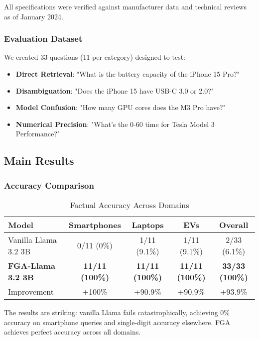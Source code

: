 \documentclass[11pt, a4paper]{article}
\theoremstyle{definition}
\begin{document}
All specifications were verified against manufacturer data and technical reviews as of January 2024.

\subsubsection{Evaluation Dataset}

We created 33 questions (11 per category) designed to test:
\begin{itemize}
    \item \textbf{Direct Retrieval}: "What is the battery capacity of the iPhone 15 Pro?"
    \item \textbf{Disambiguation}: "Does the iPhone 15 have USB-C 3.0 or 2.0?" 
    \item \textbf{Model Confusion}: "How many GPU cores does the M3 Pro have?"
    \item \textbf{Numerical Precision}: "What's the 0-60 time for Tesla Model 3 Performance?"
\end{itemize}

\subsection{Main Results}

\subsubsection{Accuracy Comparison}

\begin{table}[h]
\centering
\caption{Factual Accuracy Across Domains}
\begin{tabular}{lcccc}
\toprule
\textbf{Model} & \textbf{Smartphones} & \textbf{Laptops} & \textbf{EVs} & \textbf{Overall} \\
\midrule
Vanilla Llama 3.2 3B & 0/11 (0\%) & 1/11 (9.1\%) & 1/11 (9.1\%) & 2/33 (6.1\%) \\
\textbf{FGA-Llama 3.2 3B} & \textbf{11/11 (100\%)} & \textbf{11/11 (100\%)} & \textbf{11/11 (100\%)} & \textbf{33/33 (100\%)} \\
\midrule
Improvement & +100\% & +90.9\% & +90.9\% & +93.9\% \\
\bottomrule
\end{tabular}
\end{table}

The results are striking: vanilla Llama fails catastrophically, achieving 0\% accuracy on smartphone queries and single-digit accuracy elsewhere. FGA achieves perfect accuracy across all domains.
\end{document}
